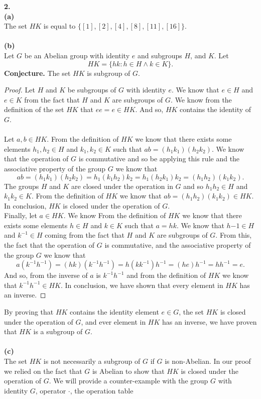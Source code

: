 \documentclass[11pt,a4paper]{article}
\begin{document}
{\bf 2.}\\
{\bf (a)}\\
The set $HK$ is equal to $\{[1],[2],[4],[8],[11],[16]\}$.\\
~\\
{\bf (b)}\\
Let $G$ be an Abelian group with identity $e$ and subgroups $H$, and $K$. Let 
\[HK = \{hk:h\in H \land k\in K\}.\]
{\bf Conjecture.} The set $HK$ is subgroup of $G$.
\begin{proof}
Let $H$ and $K$ be subgroups of $G$ with identity $e$. We know that $e\in H$ and $e\in K$ from the fact that $H$ and $K$ are subgroups of $G$. We know from the definition of the set $HK$ that $ee = e\in HK$. And so, $HK$ contains the identity of $G$.\\
~\\
Let $a,b \in HK$. From the definition of $HK$ we know that there exists some elements $h_1,h_2\in H$ and $k_1,k_2\in K$ such that $ab = (h_1k_1)(h_2k_2)$. We know that the operation of $G$ is commutative and so be applying this rule and the associative property of the group $G$ we know that 
\[ab = (h_1k_1)(h_2k_2) = h_1(k_1h_2)k_2 = h_1(h_2k_1)k_2 = (h_1h_2)(k_1k_2). \]
The groups $H$ and $K$ are closed under the operation in $G$ and so $h_1h_2\in H$ and $k_1k_2 \in K$. From the definition of $HK$ we know that $ab =(h_1h_2)(k_1k_2)\in HK $. In conclusion, $HK$ is closed under the operation of $G$.
~\\
Finally, let $a\in HK$. We know From the definition of $HK$ we know that there exists some elements $h\in H$ and $k\in K$ such that $a = hk$. We know that $h{-1}\in H$ and $k^{-1}\in H$ coming from the fact that $H$ and $K$ are subgroups of $G$. From this, the fact that the operation of $G$ is commutative, and the associative property of the group $G$ we know that
\[a(k^{-1}h^{-1}) = (hk)(k^{-1}h^{-1}) = h(kk^{-1})h^{-1} = (he)h^{-1} = hh^{-1} = e. \]
And so, from the inverse of $a$ is $k^{-1}h^{-1}$ and from the definition of $HK$ we know that $k^{-1}h^{-1} \in HK$. In conclusion, we have shown that every element in $HK$ has an inverse.
\end{proof}
By proving that $HK$ contains the identity element $e\in G$, the set $HK$ is closed under the operation of $G$, and ever element in $HK$ has an inverse, we have proven that $HK$ is a subgroup of $G$.\\
~\\
{\bf (c)}\\
The set $HK$ is not necessarily a subgroup of $G$ if $G$ is non-Abelian. In our proof we relied on the fact that $G$ is Abelian to show that $HK$ is closed under the operation of $G$. We will provide a counter-example with the group $G$ with identity $G$, operator $\cdot$, the operation table
\end{document}
